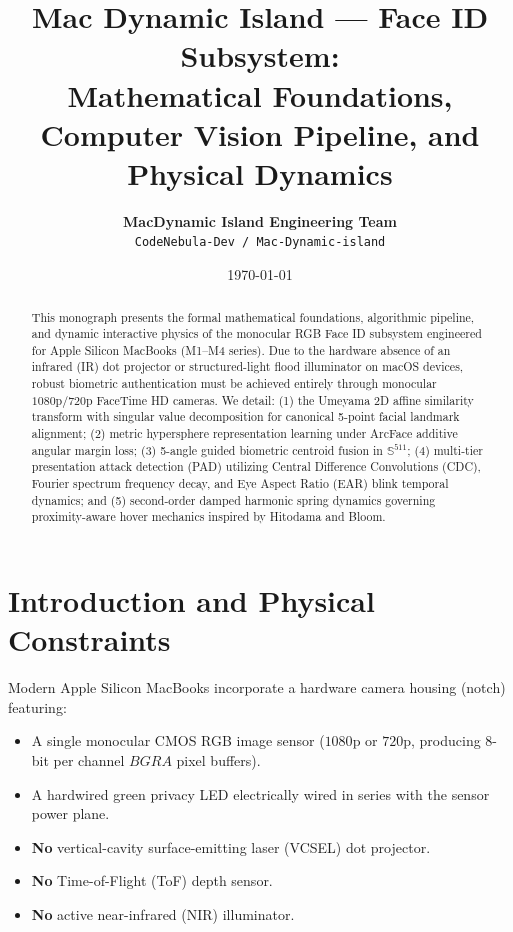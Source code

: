 \documentclass[11pt,a4paper]{article}
\title{\textbf{Mac Dynamic Island — Face ID Subsystem:}\\
\large Mathematical Foundations, Computer Vision Pipeline, and Physical Dynamics}
\author{\textbf{MacDynamic Island Engineering Team}\\
\texttt{CodeNebula-Dev / Mac-Dynamic-island}}
\date{\today}
\begin{document}
\maketitle

\begin{abstract}
This monograph presents the formal mathematical foundations, algorithmic pipeline, and dynamic interactive physics of the monocular RGB Face ID subsystem engineered for Apple Silicon MacBooks (M1--M4 series). Due to the hardware absence of an infrared (IR) dot projector or structured-light flood illuminator on macOS devices, robust biometric authentication must be achieved entirely through monocular $1080\text{p}/720\text{p}$ FaceTime HD cameras. We detail: (1) the Umeyama 2D affine similarity transform with singular value decomposition for canonical 5-point facial landmark alignment; (2) metric hypersphere representation learning under ArcFace additive angular margin loss; (3) 5-angle guided biometric centroid fusion in $\mathbb{S}^{511}$; (4) multi-tier presentation attack detection (PAD) utilizing Central Difference Convolutions (CDC), Fourier spectrum frequency decay, and Eye Aspect Ratio (EAR) blink temporal dynamics; and (5) second-order damped harmonic spring dynamics governing proximity-aware hover mechanics inspired by Hitodama and Bloom.
\end{abstract}

\tableofcontents
\newpage

\section{Introduction and Physical Constraints}

Modern Apple Silicon MacBooks incorporate a hardware camera housing (notch) featuring:
\begin{itemize}
    \item A single monocular CMOS RGB image sensor ($1080\text{p}$ or $720\text{p}$, producing 8-bit per channel $BGRA$ pixel buffers).
    \item A hardwired green privacy LED electrically wired in series with the sensor power plane.
    \item \textbf{No} vertical-cavity surface-emitting laser (VCSEL) dot projector.
    \item \textbf{No} Time-of-Flight (ToF) depth sensor.
    \item \textbf{No} active near-infrared (NIR) illuminator.
\end{itemize}
\end{document}
